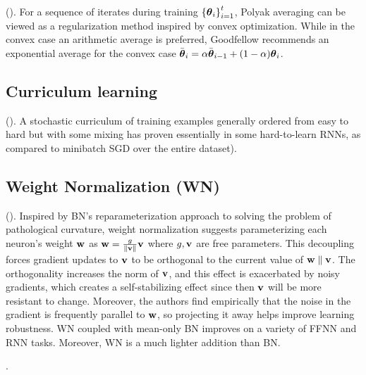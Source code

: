 \documentclass{article}
\begin{document}
(). For a sequence of iterates during training $\left\{{{\boldsymbol\theta}_i}\right\}_{i=1}^t$, Polyak averaging can be viewed as a regularization method inspired by convex optimization. While in the convex case an arithmetic average is preferred, Goodfellow recommends an exponential average for the convex case $\bar{{\boldsymbol\theta}}_i=\alpha \bar{{\boldsymbol\theta}}_{i-1}+(1-\alpha){\boldsymbol\theta}_{i}$.

\subsection{Curriculum learning}

(). A stochastic curriculum of training examples generally ordered from easy to hard but with some mixing has proven essentially in some hard-to-learn RNNs, as compared to minibatch SGD over the entire dataset).
\subsection{Weight Normalization (WN)}

(). Inspired by BN's reparameterization approach to solving the problem of pathological curvature, weight normalization suggests parameterizing each neuron's weight $\textbf{w}$ as $\textbf{w}=\frac{g}{\left\| \textbf{v} \right\|}\textbf{v}$ where $g,\textbf{v}$ are free parameters. This decoupling forces gradient updates to $\textbf{v}$ to be orthogonal to the current value of $\textbf{w}\parallel\textbf{v}$. The orthogonality increases the norm of $\textbf{v}$, and this effect is exacerbated by noisy gradients, which creates a self-stabilizing effect since then $\textbf{v}$ will be more resistant to change. Moreover, the authors find empirically that the noise in the gradient is frequently parallel to $\textbf{w}$, so projecting it away helps improve learning robustness. WN coupled with mean-only BN improves on a variety of FFNN and RNN tasks. Moreover, WN is a much lighter addition than BN.

.
\end{document}
